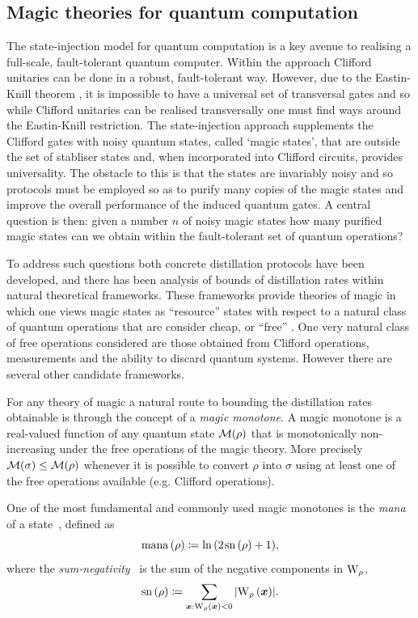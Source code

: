 \documentclass[pra,
aps,
twocolumn,
superscriptaddress,
groupedaddress,
nofootinbib,
reprint
]{revtex4-1}
\begin{document}
\subsection{Magic theories for quantum computation}
\label{sec:mono}

The state-injection model for quantum computation \ddd{[CITE]} is a key avenue to realising a full-scale, fault-tolerant quantum computer. Within the approach Clifford unitaries can be done in a robust, fault-tolerant way. However, due to the Eastin-Knill theorem \ddd{[CITE]}, it is impossible to have a universal set of transversal gates and so while Clifford unitaries can be realised transversally one must find ways around the Eastin-Knill restriction. The state-injection approach supplements the Clifford gates with noisy quantum states, called `magic states', that are outside the set of stabliser states and, when incorporated into Clifford circuits, provides universality. The obstacle to this is that the states are invariably noisy and so protocols must be employed so as to purify many copies of the magic states and improve the overall performance of the induced quantum gates. A central question is then: given a number $n$ of noisy magic states how many purified magic states can we obtain within the fault-tolerant set of quantum operations?

To address such questions both concrete distillation protocols have been developed, and there has been analysis of bounds of distillation rates within natural theoretical frameworks. These frameworks provide theories of magic in which one views magic states as ``resource'' states with respect to a natural class of quantum operations that are consider cheap, or ``free'' . One very natural class of free operations considered are those obtained from Clifford operations, measurements and the ability to discard quantum systems. However there are several other candidate frameworks. 

For any theory of magic a natural route to bounding the distillation rates obtainable is through the concept of a \emph{magic monotone}. A magic monotone is a real-valued function of any quantum state $\mathcal{M}(\rho)$ that is monotonically non-increasing under the free operations of the magic theory. More precisely $\mathcal{M}(\sigma) \le \mathcal{M}(\rho)$ whenever it is possible to convert $\rho$ into $\sigma$ using at least one of the free operations available (e.g. Clifford operations).

One of the most fundamental and commonly used magic monotones is the \emph{mana} of a state~\cite{cit:veitch2}, defined as
\begin{equation}
    {{\rm{mana}}\left(\rho\right)} \coloneqq \ln{(2\hspace{1pt} {{\rm{sn}}\left(\rho\right)} +1)},
\end{equation}
where the \emph{sum-negativity}~\cite{cit:veitch2} is the sum of the negative components in $\W{\rho}$,
\begin{equation}
    \sn{\rho} \coloneqq \sum\limits_{\bmx: \W[\bmx]{\rho} < 0} \abs{\W[\bmx]{\rho}}.
\end{equation}
\end{document}

